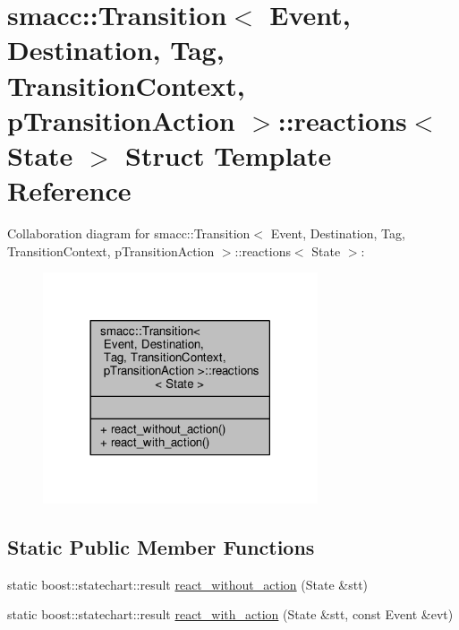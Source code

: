 \hypertarget{structsmacc_1_1Transition_1_1reactions}{}\section{smacc\+:\+:Transition$<$ Event, Destination, Tag, Transition\+Context, p\+Transition\+Action $>$\+:\+:reactions$<$ State $>$ Struct Template Reference}
\label{structsmacc_1_1Transition_1_1reactions}


Collaboration diagram for smacc\+:\+:Transition$<$ Event, Destination, Tag, Transition\+Context, p\+Transition\+Action $>$\+:\+:reactions$<$ State $>$\+:\nopagebreak
\begin{figure}[H]
\begin{center}
\leavevmode
\includegraphics[width=230pt]{structsmacc_1_1Transition_1_1reactions__coll__graph}
\end{center}
\end{figure}
\subsection*{Static Public Member Functions}
\begin{DoxyCompactItemize}
\item 
static boost\+::statechart\+::result \hyperlink{structsmacc_1_1Transition_1_1reactions_a96a69cf5b0cbd1e8fc49ca57efb37581}{react\+\_\+without\+\_\+action} (State \&stt)
\item 
static boost\+::statechart\+::result \hyperlink{structsmacc_1_1Transition_1_1reactions_a843ddc3d10e2aec66a702745852455c3}{react\+\_\+with\+\_\+action} (State \&stt, const Event \&evt)
\end{DoxyCompactItemize}


